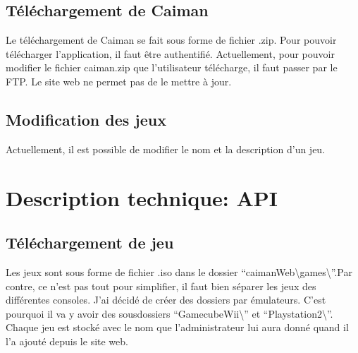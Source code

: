 \documentclass[a4paper,12pt,french]{sphinxmanual}
\begin{document}
\subsection{Téléchargement de Caiman}
\label{\detokenize{organique:telechargement-de-caiman}}
\sphinxAtStartPar
Le téléchargement de Caiman se fait sous forme de fichier .zip. Pour pouvoir télécharger l’application, il faut être authentifié. Actuellement, pour pouvoir modifier le fichier caiman.zip que l’utilisateur télécharge, il faut passer par le FTP. Le site web ne permet pas de le mettre à jour.

\begin{sphinxVerbatim}[commandchars=\\\{\}]




\end{sphinxVerbatim}


\subsection{Modification des jeux}
\label{\detokenize{organique:modification-des-jeux}}
\sphinxAtStartPar
Actuellement, il est possible de modifier le nom et la description d’un jeu.


\section{Description technique: API}
\label{\detokenize{organique:description-technique-api}}

\subsection{Téléchargement de jeu}
\label{\detokenize{organique:telechargement-de-jeu}}
\sphinxAtStartPar
Les jeux sont sous forme de fichier .iso dans le dossier “caimanWeb\textbackslash{}games\textbackslash{}”.Par contre, ce n’est pas tout pour simplifier, il faut bien séparer les jeux des différentes consoles. J’ai décidé de créer des dossiers par émulateurs. C’est pourquoi il va y avoir des sous\sphinxhyphen{}dossiers “GamecubeWii\textbackslash{}” et “Playstation2\textbackslash{}”. Chaque jeu est stocké avec le nom que l’administrateur lui aura donné quand il l’a ajouté depuis le site web.
\end{document}
